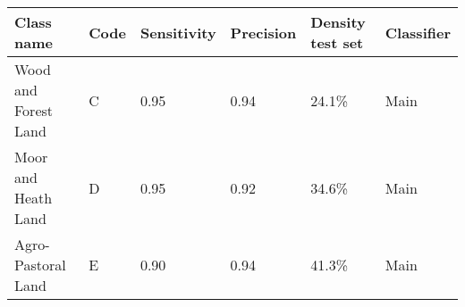 \begin{tabular}{llllll}
\toprule
 \textbf{Class name} & \textbf{Code} & \textbf{Sensitivity} & \textbf{Precision} & \textbf{Density test set} & \textbf{Classifier} \\
\midrule
Wood and Forest Land &             C &                 0.95 &               0.94 &                    24.1\% &                Main \\
 Moor and Heath Land &             D &                 0.95 &               0.92 &                    34.6\% &                Main \\
  Agro-Pastoral Land &             E &                 0.90 &               0.94 &                    41.3\% &                Main \\
\bottomrule
\end{tabular}

